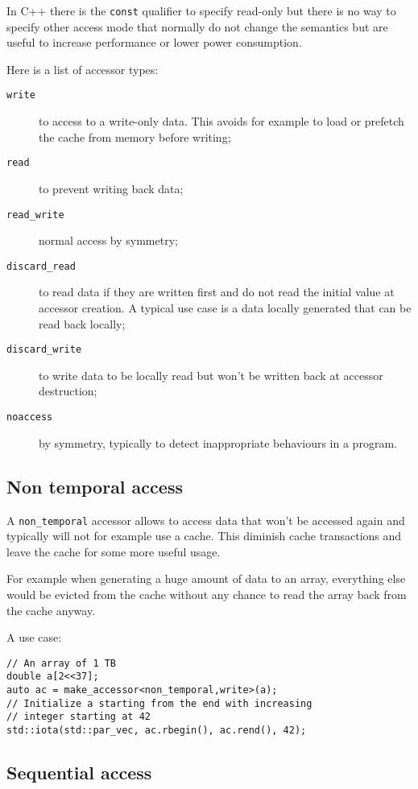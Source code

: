 \documentclass[a4paper]{article}
\begin{document}
In C++ there is the \lstinline|const| qualifier to specify read-only
but there is no way to specify other access mode that normally do not
change the semantics but are useful to increase performance or lower
power consumption.

Here is a list of accessor types:
\begin{description}
\item[\texttt{write}] to access to a write-only data. This avoids for
  example to load or prefetch the cache from memory before writing;
\item[\texttt{read}] to prevent writing back data;
\item[\texttt{read\_write}] normal access by symmetry;
\item[\texttt{discard\_read}] to read data if they are written first
  and do not read the initial value at accessor creation. A typical
  use case is a data locally generated that can be read back locally;
\item[\texttt{discard\_write}] to write data to be locally read but
  won't be written back at accessor destruction;
\item[\texttt{noaccess}] by symmetry, typically to detect
  inappropriate behaviours in a program.
\end{description}


\subsection{Non temporal access}
\label{sec:non-temporal-access}

A \lstinline|non_temporal| accessor allows to access data that won't
be accessed again and typically will not for example use a cache. This
diminish cache transactions and leave the cache for some more useful
usage.

For example when generating a huge amount of data to an array, everything else
would be evicted from the cache without any chance to read the array
back from the cache anyway.

A use case:
\begin{lstlisting}
// An array of 1 TB
double a[2<<37];
auto ac = make_accessor<non_temporal,write>(a);
// Initialize a starting from the end with increasing
// integer starting at 42
std::iota(std::par_vec, ac.rbegin(), ac.rend(), 42);
\end{lstlisting}


\subsection{Sequential access}
\label{sec:sequential-access}
\end{document}
